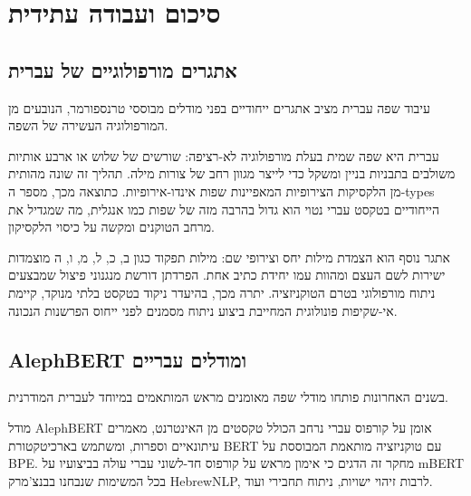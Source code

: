 \hypertarget{ux5e1ux5d9ux5dbux5d5ux5dd-ux5d5ux5e2ux5d1ux5d5ux5d3ux5d4-ux5e2ux5eaux5d9ux5d3ux5d9ux5ea}{%
\section{סיכום ועבודה
עתידית}\label{ux5e1ux5d9ux5dbux5d5ux5dd-ux5d5ux5e2ux5d1ux5d5ux5d3ux5d4-ux5e2ux5eaux5d9ux5d3ux5d9ux5ea}}

\hypertarget{ux5d0ux5eaux5d2ux5e8ux5d9ux5dd-ux5deux5d5ux5e8ux5e4ux5d5ux5dcux5d5ux5d2ux5d9ux5d9ux5dd-ux5e9ux5dc-ux5e2ux5d1ux5e8ux5d9ux5ea}{%
\subsection{אתגרים מורפולוגיים של
עברית}\label{ux5d0ux5eaux5d2ux5e8ux5d9ux5dd-ux5deux5d5ux5e8ux5e4ux5d5ux5dcux5d5ux5d2ux5d9ux5d9ux5dd-ux5e9ux5dc-ux5e2ux5d1ux5e8ux5d9ux5ea}}

עיבוד שפה עברית מציב אתגרים ייחודיים בפני מודלים מבוססי טרנספורמר,
הנובעים מן המורפולוגיה העשירה של השפה.

עברית היא שפה שמית בעלת מורפולוגיה לא-רציפה: שורשים של שלוש או ארבע
אותיות משולבים בתבניות בניין ומשקל כדי לייצר מגוון רחב של צורות מילה.
תהליך זה שונה מהותית מן הלקסיקות הצירופיות המאפיינות שפות
אינדו-אירופיות. כתוצאה מכך, מספר ה-types הייחודיים בטקסט עברי נטוי הוא
גדול בהרבה מזה של שפות כמו אנגלית, מה שמגדיל את מרחב הטוקנים ומקשה על
כיסוי הלקסיקון.

אתגר נוסף הוא הצמדת מילות יחס וצירופי שם: מילות תפקוד כגון ב, כ, ל, מ,
ו, ה מוצמדות ישירות לשם העצם ומהוות עמו יחידת כתיב אחת. הפרדתן דורשת
מנגנוני פיצול שמבצעים ניתוח מורפולוגי בטרם הטוקניזציה. יתרה מכך, בהיעדר
ניקוד בטקסט בלתי מנוקד, קיימת אי-שקיפות פונולוגית המחייבת ביצוע ניתוח
מסמנים לפני ייחוס הפרשנות הנכונה.

\hypertarget{alephbert-ux5d5ux5deux5d5ux5d3ux5dcux5d9ux5dd-ux5e2ux5d1ux5e8ux5d9ux5d9ux5dd}{%
\subsection{AlephBERT ומודלים
עבריים}\label{alephbert-ux5d5ux5deux5d5ux5d3ux5dcux5d9ux5dd-ux5e2ux5d1ux5e8ux5d9ux5d9ux5dd}}

בשנים האחרונות פותחו מודלי שפה מאומנים מראש המותאמים במיוחד לעברית
המודרנית.

מודל AlephBERT אומן על קורפוס עברי נרחב הכולל טקסטים מן האינטרנט, מאמרים
עיתונאיים וספרות, ומשתמש בארכיטקטורת BERT עם טוקניזציה מותאמת המבוססת על
BPE. מחקר זה הדגים כי אימון מראש על קורפוס חד-לשוני עברי עולה בביצועיו
על mBERT בכל המשימות שנבחנו בבנצ'מרק HebrewNLP, לרבות זיהוי ישויות,
ניתוח תחבירי ועוד.

